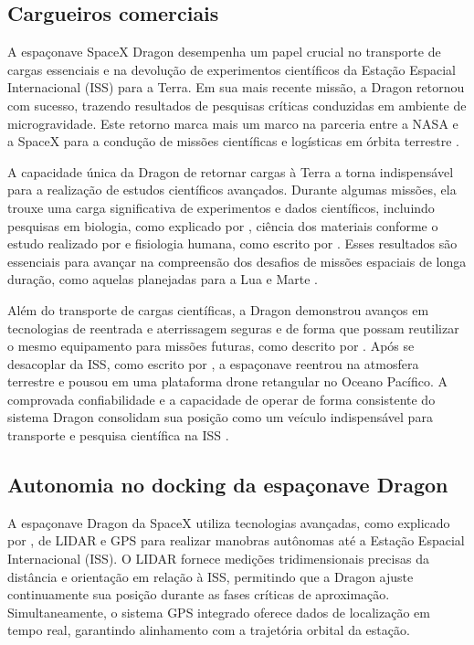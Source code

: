 \subsection{Cargueiros comerciais}

A espaçonave SpaceX Dragon desempenha um papel crucial no transporte de cargas essenciais e na devolução de experimentos científicos da Estação Espacial Internacional (ISS) para a Terra. Em sua mais recente missão, a Dragon retornou com sucesso, trazendo resultados de pesquisas críticas conduzidas em ambiente de microgravidade. Este retorno marca mais um marco na parceria entre a NASA e a SpaceX para a condução de missões científicas e logísticas em órbita terrestre \cite{nasaDragonReturn}.

A capacidade única da Dragon de retornar cargas à Terra a torna indispensável para a realização de estudos científicos avançados. Durante algumas missões, ela trouxe uma carga significativa de experimentos e dados científicos, incluindo pesquisas em biologia, como explicado por \cite{bell2018}, ciência dos materiais conforme o estudo realizado por \cite{chamberlain2021} e fisiologia humana, como escrito por \cite{wang2018}. Esses resultados são essenciais para avançar na compreensão dos desafios de missões espaciais de longa duração, como aquelas planejadas para a Lua e Marte \cite{nasaDragonReturn}.

Além do transporte de cargas científicas, a Dragon demonstrou avanços em tecnologias de reentrada e aterrissagem seguras e de forma que possam reutilizar o mesmo equipamento para missões futuras, como descrito por \cite{nasaFalcon9Dragon}. Após se desacoplar da ISS, como escrito por \cite{nasaspaceflightDroneShip}, a espaçonave reentrou na atmosfera terrestre e pousou em uma plataforma drone retangular no Oceano Pacífico. A comprovada confiabilidade e a capacidade de operar de forma consistente do sistema Dragon consolidam sua posição como um veículo indispensável para transporte e pesquisa científica na ISS \cite{nasaDragonReturn}.

\subsection{Autonomia no docking da espaçonave Dragon}

A espaçonave Dragon da SpaceX utiliza tecnologias avançadas, como explicado por \cite{nasaspaceflightDragonISS}, de LIDAR e GPS para realizar manobras autônomas até a Estação Espacial Internacional (ISS). O LIDAR fornece medições tridimensionais precisas da distância e orientação em relação à ISS, permitindo que a Dragon ajuste continuamente sua posição durante as fases críticas de aproximação. Simultaneamente, o sistema GPS integrado oferece dados de localização em tempo real, garantindo alinhamento com a trajetória orbital da estação.

